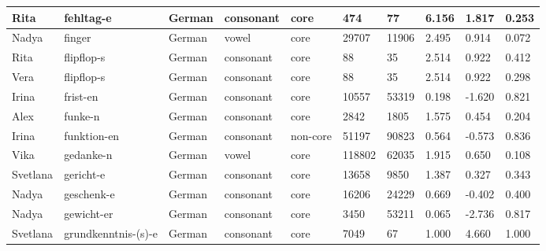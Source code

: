 \begin{longtable}{|p{1.2cm}|p{3cm}|p{1cm}|p{1.5cm}|p{1.5cm}|R{1.2cm}|R{1cm}|R{1cm}|R{0.8cm}|R{0.8cm}|}
Rita      & fehltag-e              & German        & consonant        & core      & 474          & 77             & 6.156                 & 1.817             & 0.253        \\ \hline
Nadya     & finger                 & German        & vowel            & core      & 29707        & 11906          & 2.495                 & 0.914             & 0.072        \\ \hline
Rita      & flipflop-s             & German        & consonant        & core      & 88           & 35             & 2.514                 & 0.922             & 0.412        \\ \hline
Vera      & flipflop-s             & German        & consonant        & core      & 88           & 35             & 2.514                 & 0.922             & 0.298        \\ \hline
Irina     & frist-en               & German        & consonant        & core      & 10557        & 53319          & 0.198                 & -1.620            & 0.821        \\ \hline
Alex      & funke-n                & German        & consonant        & core      & 2842         & 1805           & 1.575                 & 0.454             & 0.204        \\ \hline
Irina     & funktion-en            & German        & consonant        & non-core  & 51197        & 90823          & 0.564                 & -0.573            & 0.836        \\ \hline
Vika      & gedanke-n              & German        & vowel            & core      & 118802       & 62035          & 1.915                 & 0.650             & 0.108        \\ \hline
Svetlana  & gericht-e              & German        & consonant        & core      & 13658        & 9850           & 1.387                 & 0.327             & 0.343        \\ \hline
Nadya     & geschenk-e             & German        & consonant        & core      & 16206        & 24229          & 0.669                 & -0.402            & 0.400        \\ \hline
Nadya     & gewicht-er             & German        & consonant        & core      & 3450         & 53211          & 0.065                 & -2.736            & 0.817        \\ \hline
Svetlana  & grundkenntnis-(s)-e    & German        & consonant        & core      & 7049         & 67             & 1.000                 & 4.660             & 1.000        \\ \hline

\end{longtable}
